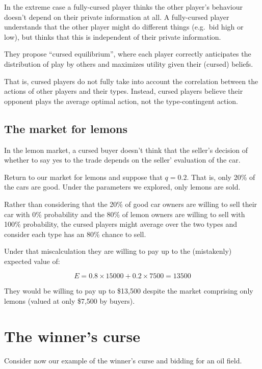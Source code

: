 \documentclass[
  letterpaper,
  DIV=11,
  numbers=noendperiod]{scrreprt}
\begin{document}
In the extreme case a fully-cursed player thinks the other player's
behaviour doesn't depend on their private information at all. A
fully-cursed player understands that the other player might do different
things (e.g.~bid high or low), but thinks that this is independent of
their private information.

They propose ``cursed equilibrium'', where each player correctly
anticipates the distribution of play by others and maximizes utility
given their (cursed) beliefs.

That is, cursed players do not fully take into account the correlation
between the actions of other players and their types. Instead, cursed
players believe their opponent plays the average optimal action, not the
type-contingent action.

\hypertarget{the-market-for-lemons-1}{%
\subsection{The market for lemons}\label{the-market-for-lemons-1}}

In the lemon market, a cursed buyer doesn't think that the seller's
decision of whether to say yes to the trade depends on the seller'
evaluation of the car.

Return to our market for lemons and suppose that \(q=0.2\). That is,
only 20\% of the cars are good. Under the parameters we explored, only
lemons are sold.

Rather than considering that the 20\% of good car owners are willing to
sell their car with 0\% probability and the 80\% of lemon owners are
willing to sell with 100\% probability, the cursed players might average
over the two types and consider each type has an 80\% chance to sell.

Under that miscalculation they are willing to pay up to the (mistakenly)
expected value of:

\[
E=0.8×15000+0.2×7500=13500
\]

They would be willing to pay up to \$13,500 despite the market
comprising only lemons (valued at only \$7,500 by buyers).

\hypertarget{the-winners-curse-1}{%
\section{The winner's curse}\label{the-winners-curse-1}}

Consider now our example of the winner's curse and bidding for an oil
field.
\end{document}
